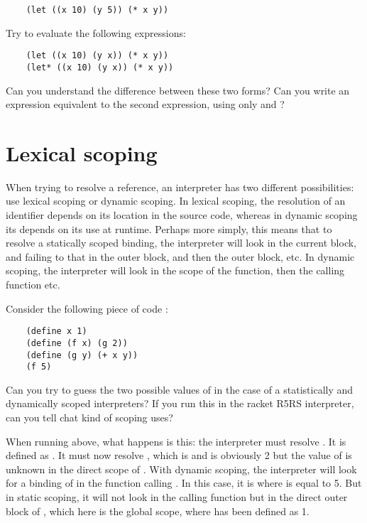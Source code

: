 \documentclass{../../../tp}
\begin{document}
	\begin{verbatim}
	(let ((x 10) (y 5)) (* x y))
	\end{verbatim}

\begin{instruction}
	
	Try to evaluate the following expressions:
	
	\begin{verbatim}
	(let ((x 10) (y x)) (* x y))
	(let* ((x 10) (y x)) (* x y))
	\end{verbatim}
	
	Can you understand the difference between these two forms? Can you write an expression equivalent to the second expression, using only  and ?  
	
\end{instruction}


\section{Lexical scoping}

When trying to resolve a reference, an interpreter has two different possibilities: use lexical scoping or dynamic scoping. In lexical scoping, the resolution of an identifier depends on its location in the source code, whereas in dynamic scoping its depends on its use at runtime. Perhaps more simply, this means that to resolve a statically scoped binding, the interpreter will look in the current block, and failing to that in the outer block, and then the outer block, etc. In dynamic scoping, the interpreter will look in the scope of the function, then the calling function etc. 

\begin{instruction}
	Consider the following piece of code :
	\begin{verbatim}
	(define x 1)
	(define (f x) (g 2))
	(define (g y) (+ x y))
	(f 5)   
	\end{verbatim}
	
	Can you try to guess the two possible values of  in the case of a statistically and dynamically scoped interpreters? If you run this in the racket R5RS interpreter, can you tell chat kind of scoping \scheme uses?
	
\end{instruction}

When running  above, what happens is this: the interpreter must resolve . It is defined as . It must now resolve , which is  and  is obviously 2 but the value of  is unknown in the direct scope of . With dynamic scoping, the interpreter will look for a binding of  in the function calling . In this case, it is  where  is equal to 5. But in static scoping, it will not look in the calling function but in the direct outer block of , which here is the global scope, where  has been defined as 1.
\end{document}
